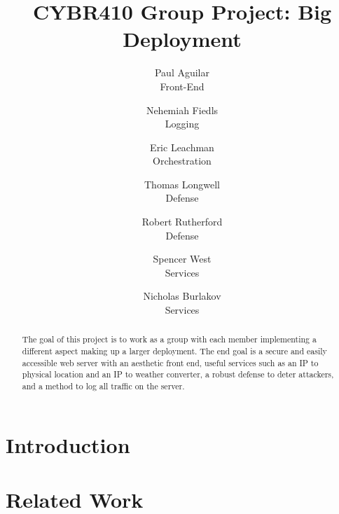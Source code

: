 \documentclass[letterpaper,twocolumn,10pt]{article}
\begin{document}

\date{}

\title{\Large \bf CYBR410 Group Project: Big Deployment}

\author{
  {\rm Paul Aguilar}\\
  Front-End
  \and
  {\rm Nehemiah Fiedls}\\
  Logging
  \and
  {\rm Eric Leachman}\\
  Orchestration
  \and
  {\rm Thomas Longwell}\\
  Defense
  \and
  {\rm Robert Rutherford}\\
  Defense
  \and
  {\rm Spencer West}\\
  Services
  \and
  {\rm Nicholas Burlakov}\\
  Services
}

\maketitle

\begin{abstract}
The goal of this project is to work as a group with each member implementing a different aspect making up a larger deployment. The end goal is a secure and easily accessible web server with an aesthetic front end, useful services such as an IP to physical location and an IP to weather converter, a robust defense to deter attackers,  and a method to log all traffic on the server. 
\end{abstract}


\section{Introduction} \label{Introduction}


\section{Related Work} \label{Related Work}

\end{document}
